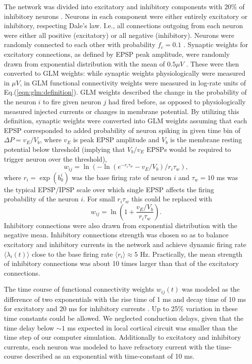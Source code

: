 \documentclass[amsmath,amssymb]{revtex4}
\begin{document}
The network was divided into excitatory and inhibitory components with 20\% of inhibitory neurons \cite{Braitenberg1998,Urquijo2000}.
Neurons in each component were either entirely excitatory or inhibitory, respecting Dale's law. I.e., all connections outgoing from each neuron were either all positive (excitatory) or all negative (inhibitory). Neurons were randomly connected to each other with probability $f_c=0.1$ \cite{Braitenberg1998,Lefort2009}.
Synaptic weights for excitatory connections, as defined by EPSP peak amplitude, were randomly drawn from exponential distribution with the mean of $0.5 \mu V$ \cite{Lefort2009,Sayer1990}. These were then converted to GLM weights: while synaptic weights physiologically were measured in $\mu V$, in GLM functional connectivity weights were measured in log-rate units of Eq.(\ref{eqn:glm:definition}). GLM weights described the change in the probability of the neuron $i$ to fire given neuron $j$ had fired before, as opposed to physiologically measured injected currents or changes in membrane potential. By utilizing this definition, synaptic weights were converted into GLM weights assuming that each EPSP corresponded to added probability of neuron spiking in given time bin of $\Delta P = v_{E}/V_{b}$, where $v_E$ is peak EPSP amplitude and $V_b$ is the membrane resting potential below threshold (implying that $V_{b}/v_{E}$ EPSPs would be required to trigger neuron over the threshold),
\begin{equation}\label{eqn:convert}
w_{ij}=\ln(-\ln(e^{-r_i\tau_w}-v_{E}/V_{b})/r_i\tau_w),
\end{equation}
where $r_i=\exp(b^i_0)$ was the base firing rate of neuron $i$ and $\tau_w=10$ ms was the typical EPSP/IPSP scale over which single EPSP affects the firing probability of the neuron $i$. 
For small $r_i\tau_w$ this could be replaced with
\begin{equation}\label{eqn:convert-smalldt}
w_{ij}=\ln\left(1+\frac{v_{E}/V_{b}}{r_i\tau_w}\right).
\end{equation}
Inhibitory connections were also drawn from exponential distribution with the negative mean. Inhibitory connections strength was chosen so as to balance excitatory and inhibitory currents in the network and achieve dynamic firing rate $\langle \lambda_i(t) \rangle$ close to the base firing rate $\langle r_i\rangle \approx 5 $ Hz. Practically, the mean strength of inhibitory connections was about 10 times larger than that of the excitatory connections. 

The time course of functional connectivity weights $w_{ij}(t)$ was modeled as the difference of two exponentials with the rise time of 1 ms and decay time of 10 ms for excitatory and 20 ms for inhibitory currents \cite{Sayer1990}. Up to 25\% variation in these time constants could be allowed. We neglected conduction delays, given that the time delay below $\sim 1$ ms expected in local cortical circuit was smaller than the time step of our computer simulation.
Additionally to excitatory and inhibitory currents, each neuron was modeled to have refractory current with the time-course described as an exponential with time-constant of 10 ms.
\end{document}
